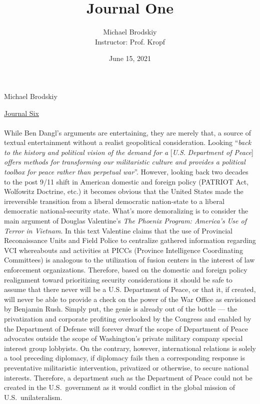 \documentclass[12pt]{article}
\title{Journal One}
\date{June 15, 2021}
\author{Michael Brodskiy\\ \small Instructor: Prof. Kropf}
\begin{document}
\flushleft Michael Brodskiy

\begin{center}

 \underline{Journal Six}

\end{center}

\begin{justify}
  \paragraph{} While Ben Dangl's arguments are entertaining, they are merely that, a source of textual entertainment without a realist geopolitical consideration. Looking “\emph{back to the history and political vision of the demand for a} [\emph{U}.\emph{S}. \emph{Department of Peace}] \emph{offers methods for transforming our militaristic culture and provides a political toolbox for peace rather than perpetual war}”. However, looking back two decades to the post 9/11 shift in American domestic and foreign policy (PATRIOT Act, Wolfowitz Doctrine, etc.) it becomes obvious that the United States made the irreversible transition from a liberal democratic nation-state to a liberal democratic national-security state. What's more demoralizing is to consider the main argument of Douglas Valentine's \emph{The Phoenix Program: America's Use of Terror in Vietnam}. In this text Valentine claims that the use of Provincial Reconaissance Units and Field Police to centralize gathered information regarding VCI whereabouts and activities at PICCs (Province Intelligence Coordinating Committees) is analogous to the utilization of fusion centers in the interest of law enforcement organizations. Therefore, based on the domestic and foreign policy realignment toward prioritizing security considerations it should be safe to assume that there never will be a U.S. Department of Peace, or that it, if created, will never be able to provide a check on the power of the War Office as envisioned by Benjamin Rush. Simply put, the genie is already out of the bottle — the privatization and corporate profiting overlooked by the Congress and enabled by the Department of Defense will forever dwarf the scope of Department of Peace advocates outside the scope of Washington's private military company special interest group lobbyists. On the contrary, however, international relations is solely a tool preceding diplomacy, if diplomacy fails then a corresponding response is preventative militaristic intervention, privatized or otherwise, to secure national interests. Therefore, a department such as the Department of Peace could not be created in the U.S.\ government as it would conflict in the global mission of U.S.\ unilateralism.
\end{justify}
\end{document}
